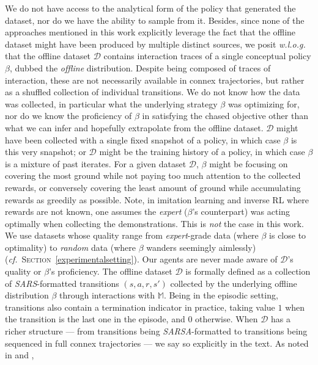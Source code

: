We do not have access to the analytical form of the policy that generated the dataset,
nor do we have the ability to sample from it.
Besides, since none of the approaches mentioned in this work explicitly leverage the fact that the offline dataset might
have been produced by multiple distinct sources,
we posit \textit{w.l.o.g.} that the offline dataset $\mathcal{D}$ contains interaction traces
of a single conceptual policy $\beta$, dubbed the \emph{offline} distribution.
Despite being composed of traces of interaction, these are not necessarily available in connex trajectories, but
rather as a shuffled collection of individual transitions.
We do not know how the data was collected, in particular what the underlying strategy $\beta$ was optimizing for,
nor do we know the proficiency of $\beta$ in satisfying the chased objective other
than what we can infer and hopefully extrapolate from the offline dataset.
$\mathcal{D}$ might have been collected with a single fixed snapshot of a policy, in which case $\beta$ is this
very snapshot; or $\mathcal{D}$ might be the training history of a policy, in which case $\beta$
is a mixture of past iterates.
For a given dataset $\mathcal{D}$,
$\beta$ might be focusing on covering the most ground while not paying too much attention
to the collected rewards, or conversely covering the least amount of ground while accumulating
rewards as greedily as possible.
Note, in imitation learning and inverse RL \cite{Bagnell2015-ni}
where rewards are not known,
one assumes the \textit{expert} ($\beta$'s counterpart) was acting optimally when collecting the demonstrations.
This is \emph{not} the case in this work.
We use datasets whose quality range from \textit{expert}-grade
data (where $\beta$ is close to optimality)
to \textit{random} data (where $\beta$ wanders seemingly aimlessly)
(\textit{cf.}~\textsc{Section}~\ref{experimentalsetting}).
Our agents are never made aware of $\mathcal{D}$'s quality or $\beta$'s proficiency.
The offline dataset $\mathcal{D}$ is formally defined as a collection of \textit{SARS}-formatted transitions
$(s, a, r, s')$
collected by the underlying offline distribution $\beta$ through interactions with $\mathbb{M}$.
Being in the episodic setting, transitions also contain a termination indicator
in practice, taking value $1$ when the
transition is the last one in the episode, and $0$ otherwise.
When $\mathcal{D}$ has a richer structure --- from transitions being \textit{SARSA}-formatted to transitions being
sequenced in full connex trajectories --- we say so explicitly in the text.
As noted in \cite{Fujimoto2018-mj} and \cite{Laroche2019-ar},
